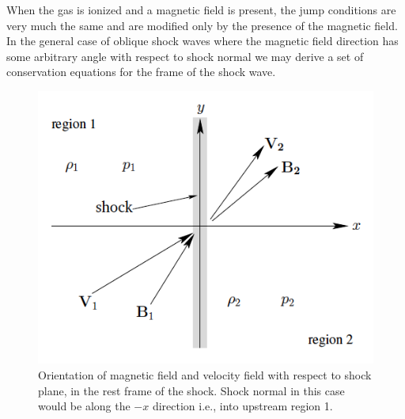 When the gas is ionized and a magnetic field is present, the jump conditions are very much the same and are modified only by the presence of the magnetic field. In the general case of oblique shock waves where the magnetic field direction has some arbitrary angle with respect to shock normal we may derive a set of conservation equations for the frame of the shock wave. 
\begin{figure}[h!]
\begin{center}
\includegraphics[scale=0.5, angle=0]{images/shock_pic}
\caption[MHD shock framework]{Orientation of magnetic field and velocity field with respect to shock plane, in the rest frame of the shock. Shock normal in this case would be along the $-x$ direction i.e., into upstream region 1. \citep{fitz}}
\label{fig:shock_pic}
\end{center}
\end{figure}

